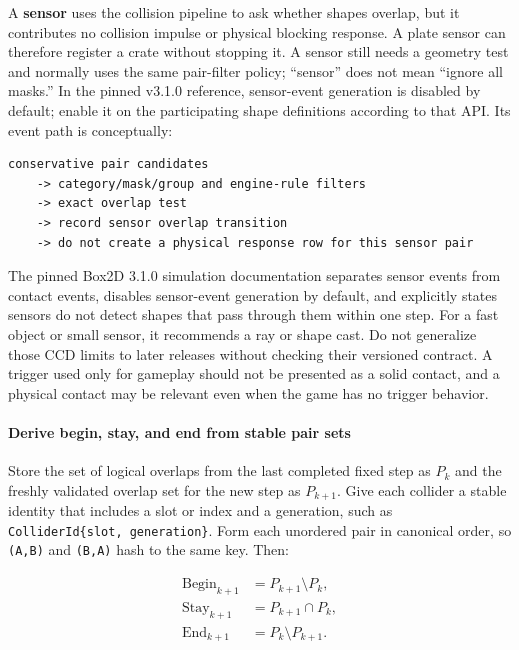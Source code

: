 A \textbf{sensor} uses the collision pipeline to ask whether shapes overlap, but it contributes no collision impulse or physical blocking response. A plate sensor can therefore register a crate without stopping it. A sensor still needs a geometry test and normally uses the same pair-filter policy; ``sensor'' does not mean ``ignore all masks.'' In the pinned v3.1.0 reference, sensor-event generation is disabled by default; enable it on the participating shape definitions according to that API. Its event path is conceptually:

\begin{verbatim}
conservative pair candidates
    -> category/mask/group and engine-rule filters
    -> exact overlap test
    -> record sensor overlap transition
    -> do not create a physical response row for this sensor pair
\end{verbatim}

The pinned Box2D 3.1.0 simulation documentation separates sensor events from contact events, disables sensor-event generation by default, and explicitly states sensors do not detect shapes that pass through them within one step. For a fast object or small sensor, it recommends a ray or shape cast. Do not generalize those CCD limits to later releases without checking their versioned contract. A trigger used only for gameplay should not be presented as a solid contact, and a physical contact may be relevant even when the game has no trigger behavior.

\paragraph{Derive begin, stay, and end from stable pair sets}\label{derive-begin-stay-and-end-from-stable-pair-sets}

Store the set of logical overlaps from the last completed fixed step as \(P_k\) and the freshly validated overlap set for the new step as \(P_{k+1}\). Give each collider a stable identity that includes a slot or index and a generation, such as \texttt{ColliderId\{slot,\ generation\}}. Form each unordered pair in canonical order, so \texttt{(A,B)} and \texttt{(B,A)} hash to the same key. Then:

\[
\begin{aligned}\mathrm{Begin}_{k+1} &= P_{k+1} \setminus P_k,\\\mathrm{Stay}_{k+1} &= P_{k+1} \cap P_k,\\\mathrm{End}_{k+1} &= P_k \setminus P_{k+1}.\end{aligned}
\]

